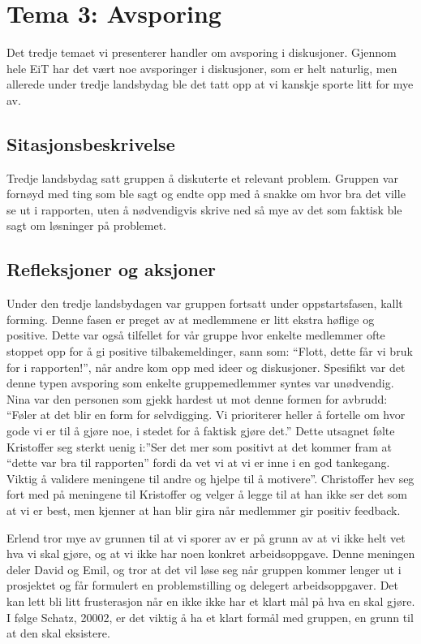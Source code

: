 \chapter{Tema 3: Avsporing}
Det tredje temaet vi presenterer handler om avsporing i diskusjoner. Gjennom hele EiT har det vært noe avsporinger i diskusjoner, som er helt naturlig, men allerede under tredje landsbydag ble det tatt opp at vi kanskje sporte litt for mye av.
\section{Sitasjonsbeskrivelse}
Tredje landsbydag satt gruppen å diskuterte et relevant problem. Gruppen var fornøyd med ting som ble sagt og endte opp med å snakke om hvor bra det ville se ut i rapporten, uten å nødvendigvis skrive ned så mye av det som faktisk ble sagt om løsninger på problemet.
\section{Refleksjoner og aksjoner}
Under den tredje landsbydagen var gruppen fortsatt under oppstartsfasen, kallt forming. Denne fasen er preget av at medlemmene er litt ekstra høflige og positive. Dette var også tilfellet for vår gruppe hvor enkelte medlemmer ofte stoppet opp for å gi positive tilbakemeldinger, sann som: “Flott, dette får vi bruk for i rapporten!”, når andre kom opp med ideer og diskusjoner. Spesifikt var det denne typen avsporing som enkelte gruppemedlemmer syntes var unødvendig. Nina var den personen som gjekk hardest ut mot denne formen for avbrudd: “Føler at det blir en form for selvdigging. Vi prioriterer heller å fortelle om hvor gode vi er til å gjøre noe, i stedet for å faktisk gjøre det.” Dette utsagnet følte Kristoffer seg sterkt uenig i:”Ser det mer som positivt at det kommer fram at “dette var bra til rapporten” fordi da vet vi at vi er inne i en god tankegang. Viktig å validere meningene til andre og hjelpe til å motivere”. Christoffer hev seg fort med på meningene til Kristoffer og velger å legge til at han ikke ser det som at vi er best, men kjenner at han blir gira når medlemmer gir positiv feedback. 

Erlend tror mye av grunnen til at vi sporer av er på grunn av at vi ikke helt vet hva vi skal gjøre, og at vi ikke har noen konkret arbeidsoppgave. Denne meningen deler David og Emil, og tror at det vil løse seg når gruppen kommer lenger ut i prosjektet og får formulert en problemstilling og delegert arbeidsoppgaver. Det kan lett bli litt frusterasjon når en ikke ikke har et klart mål på hva en skal gjøre. I følge Schatz, 20002, er det viktig å ha et klart formål med gruppen, en grunn til at den skal eksistere.

